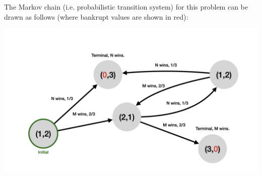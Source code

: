 \documentclass[10pt,a4paper]{article}
\begin{document}
The Markov chain (i.e. probabilistic transition system) for this problem can be drawn as follows (where bankrupt values are shown in red):
\begin{center}
    \includegraphics[scale=0.1]{diagrams/prob_diagrams/prob_diagrams.002.png}
\end{center}

% 
% 
\end{document}
